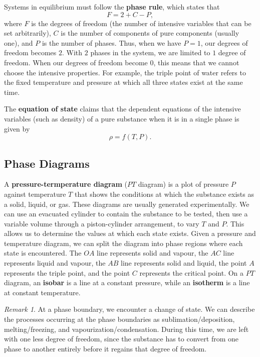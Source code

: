 \documentclass[11pt]{article}
\theoremstyle{plain} %
\theoremstyle{definition}
\theoremstyle{example}
\theoremstyle{remark}
\newtheorem*{remark}{Remark}
\begin{document}
Systems in equilibrium must follow the \textbf{phase rule}, which states that 
$$F = 2+C-P,$$
where $F$ is the degrees of freedom (the number of intensive variables that can be set arbitrarily), $C$ is the number of components of pure components (usually one), and $P$ is the number of phases. Thus, when we have $P=1$, our degrees of freedom becomes $2$. With $2$ phases in the system, we are limited to $1$ degree of freedom. When our degrees of freedom become $0$, this means that we cannot choose the intensive properties. For example, the triple point of water refers to the fixed temperature and pressure at which all three states exist at the same time. 

The \textbf{equation of state} claims that the dependent equations of the intensive variables (such as density) of a pure substance when it is in a single phase is given by
$$\rho = f(T,P).$$

\subsection{Phase Diagrams}

A \textbf{pressure-termperature diagram} ($PT$ diagram) is a plot of pressure $P$ against temperature $T$ that shows the conditions at which the substance exists as a solid, liquid, or gas. These diagrams are usually generated experimentally. We can use an evacuated cylinder to contain the substance to be tested, then use a variable volume through a piston-cylinder arrangement, to vary $T$ and $P$. This allows us to determine the values at which each state exists. Given a pressure and temperature diagram, we can split the diagram into phase regions where each state is encountered. The $OA$ line represents solid and vapour, the $AC$ line represents liquid and vapour, the $AB$ line represents solid and liquid, the point $A$ represents the triple point, and the point $C$ represents the critical point. On a $PT$ diagram, an \textbf{isobar} is a line at a constant pressure, while an \textbf{isotherm} is a line at constant temperature. 

\begin{remark}
At a phase boundary, we encounter a change of state. We can describe the processes occurring at the phase boundaries as sublimation/deposition, melting/freezing, and vapourization/condensation. During this time, we are left with one less degree of freedom, since the substance has to convert from one phase to another entirely before it regains that degree of freedom. 
\end{remark}
\end{document}
